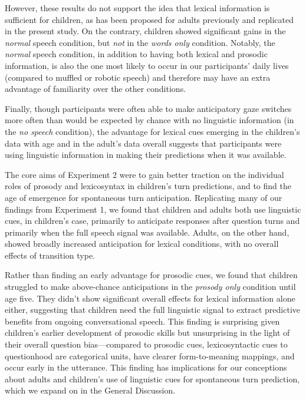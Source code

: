 \documentclass[authoryear, 12pt]{elsarticle}
\begin{document}
However, these results do not support the idea that lexical information is sufficient for children, as has been proposed for adults previously \citealp{de-ruiter2006} and replicated in the present study. On the contrary, children showed significant gains in the \textit{normal} speech condition, but \textit{not} in the \textit{words only} condition. Notably, the \textit{normal} speech condition, in addition to having both lexical and prosodic information, is also the one most likely to occur in our participants' daily lives (compared to muffled or robotic speech) and therefore may have an extra advantage of familiarity over the other conditions.

Finally, though participants were often able to make anticipatory gaze switches more often than would be expected by chance with no linguistic information (in the \textit{no speech} condition), the advantage for lexical cues emerging in the children's data with age and in the adult's data overall suggests that participants were using linguistic information in making their predictions when it was available.

The core aims of Experiment 2 were to gain better traction on the individual roles of prosody and lexicosyntax in children's turn predictions, and to find the age of emergence for spontaneous turn anticipation. Replicating many of our findings from Experiment 1, we found that children and adults both use linguistic cues, in children's case, primarily to anticipate responses after question turns and primarily when the full speech signal was available. Adults, on the other hand, showed broadly increased anticipation for lexical conditions, with no overall effects of transition type.

Rather than finding an early advantage for prosodic cues, we found that children struggled to make above-chance anticipations in the \textit{prosody only} condition until age five. They didn't show significant overall effects for lexical information alone either, suggesting that children need the full linguistic signal to extract predictive benefits from ongoing conversational speech. This finding is surprising given children's earlier development of prosodic skills but unsurprising in the light of their overall question bias---compared to prosodic cues, lexicosyntactic cues to questionhood are categorical units, have clearer form-to-meaning mappings, and occur early in the utterance. This finding has implications for our conceptions about adults and children's use of linguistic cues for spontaneous turn prediction, which we expand on in the General Discussion.
\end{document}
